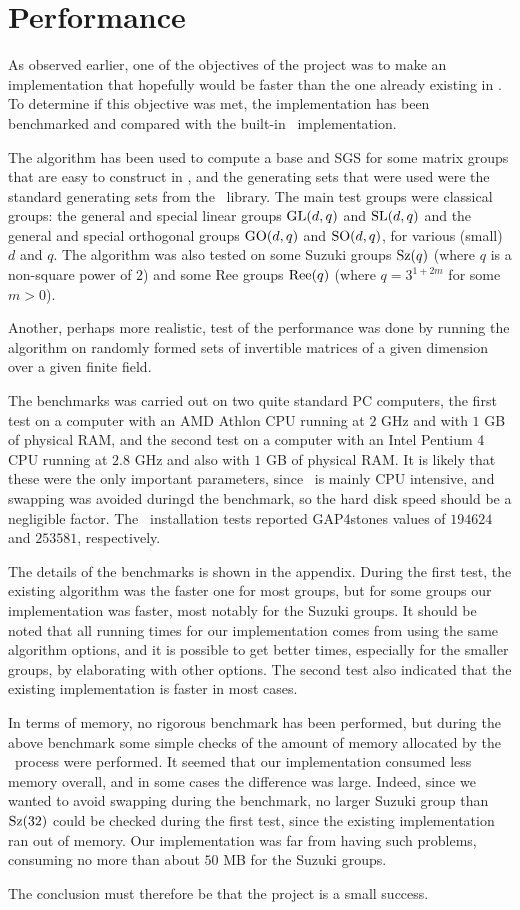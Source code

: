 \chapter{Performance}

As observed earlier, one of the objectives of the project was to make
an implementation that hopefully would be faster than the one already
existing in \GAP. To determine if this objective was met, the
implementation has been benchmarked and compared with the built-in
\GAP~implementation.

The algorithm has been used to compute a base and SGS for some matrix
groups that are easy to construct in \GAP, and the generating sets
that were used were the standard generating sets from the
\GAP~library. The main test groups were classical groups: the general
and special linear groups $\operatorname{GL}(d, q)$ and $\operatorname{SL}(d, q)$ and the general
and special orthogonal groups $\operatorname{GO}(d, q)$ and $\operatorname{SO}(d, q)$, for various
(small) $d$ and $q$. The algorithm was also tested on some Suzuki
groups $\operatorname{Sz}(q)$ (where $q$ is a non-square power of $2$) and some Ree
groups $\operatorname{Ree}(q)$ (where $q = 3^{1 + 2m}$ for some $m > 0$).

Another, perhaps more realistic, test of the performance was done by
running the algorithm on randomly formed sets of invertible matrices
of a given dimension over a given finite field.

The benchmarks was carried out on two quite standard PC computers, the first test on a computer with an AMD Athlon
CPU running at $2$ GHz and with $1$ GB of physical RAM, and the second test on a computer with an Intel Pentium 4 CPU running at $2.8$ GHz and also with $1$ GB of physical RAM. It is likely
that these were the only important parameters, since \GAP~is mainly
CPU intensive, and swapping was avoided duringd the benchmark, so the hard disk speed should be a negligible factor. The
\GAP~installation tests reported GAP4stones values of $194624$ and $253581$, respectively.

The details of the benchmarks is shown in the appendix. During the first test, the existing algorithm was the faster one for most groups, but for some groups
our implementation was faster, most notably for the Suzuki groups. It
should be noted that all running times for our implementation comes
from using the same algorithm options, and it is possible to get
better times, especially for the smaller groups, by elaborating with
other options. The second test also indicated that the existing implementation is faster in most cases.

In terms of memory, no rigorous benchmark has been performed, but
during the above benchmark some simple checks of the amount of memory
allocated by the \GAP~process were performed. It seemed that our
implementation consumed less memory overall, and in some cases the
difference was large. Indeed, since we wanted to avoid swapping during
the benchmark, no larger Suzuki group than $\operatorname{Sz}(32)$ could be checked during the first test, since the existing implementation ran out of memory. Our
implementation was far from having such problems, consuming no more
than about $50$ MB for the Suzuki groups.

The conclusion must therefore be that the project is a small success.
